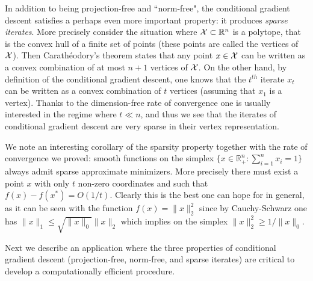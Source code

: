 In addition to being projection-free and ``norm-free", the conditional gradient descent satisfies a perhaps even more important property: it produces {\em sparse iterates}. More precisely consider the situation where $\mathcal{X} \subset \mathbb{R}^n$ is a polytope, that is the convex hull of a finite set of points (these points are called the vertices of $\mathcal{X}$). Then Carath\'eodory's theorem states that any point $x \in \mathcal{X}$ can be written as a convex combination of at most $n+1$ vertices of $\mathcal{X}$. On the other hand, by definition of the conditional gradient descent, one knows that the $t^{th}$ iterate $x_t$ can be written as a convex combination of $t$ vertices (assuming that $x_1$ is a vertex). Thanks to the dimension-free rate of convergence one is usually interested in the regime where $t \ll n$, and thus we see that the iterates of conditional gradient descent are very sparse in their vertex representation.

We note an interesting corollary of the sparsity property together with the rate of convergence we proved: smooth functions on the simplex $\{x \in \mathbb{R}_+^n : \sum_{i=1}^n x_i = 1\}$ always admit sparse approximate minimizers. More precisely there must exist a point $x$ with only $t$ non-zero coordinates and such that $f(x) - f(x^*) = O(1/t)$. Clearly this is the best one can hope for in general, as it can be seen with the function $f(x) = \|x\|^2_2$ since by Cauchy-Schwarz one has $\|x\|_1 \leq \sqrt{\|x\|_0} \|x\|_2$ which implies on the simplex $\|x\|_2^2 \geq 1 / \|x\|_0$.
%

Next we describe an application where the three properties of conditional gradient descent (projection-free, norm-free, and sparse iterates) are critical to develop a computationally efficient procedure.

